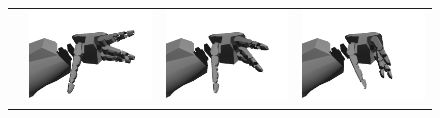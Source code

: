 \begin{figure}
\begin{tabular}{cc:c:c}
 & \includegraphics[width=\imgwidth]{images/eval_vicon/sequence/finger_movement/rep_0.png} & \includegraphics[width=\imgwidth]{images/eval_vicon/sequence/finger_movement/rep_33.png} & \includegraphics[width=\imgwidth]{images/eval_vicon/sequence/finger_movement/rep_61.png} \\

\end{tabular}
\end{figure}
